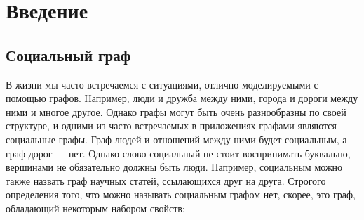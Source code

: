 \section{Введение}
\subsection{Социальный граф}
В жизни мы часто встречаемся с ситуациями, отлично моделируемыми с помощью
графов. Например, люди и дружба между ними, города и дороги между ними и
многое другое. Однако графы могут быть очень разнообразны по своей структуре, и
одними из часто встречаемых в приложениях графами являются социальные графы.
Граф людей и отношений между ними будет социальным, а граф дорог — нет. Однако
слово социальный не стоит воспринимать буквально, вершинами не обязательно
должны быть люди. Например, социальным можно также назвать граф научных статей,
ссылающихся друг на друга. Строгого определения того, что можно называть
социальным графом нет, скорее, это граф, обладающий некоторым набором свойств:

\clearpage
